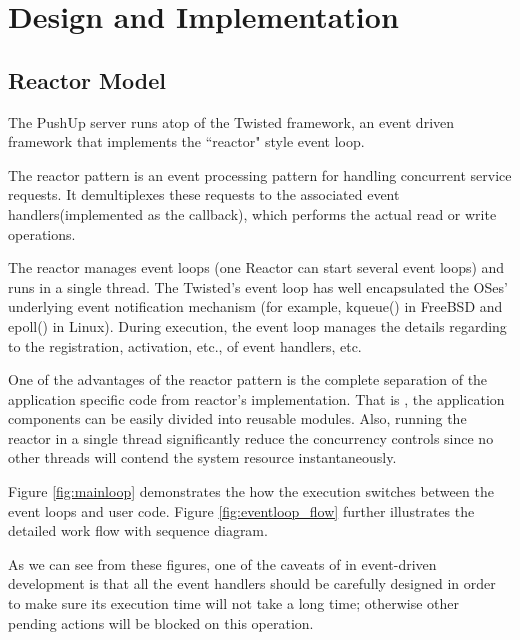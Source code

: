 \section {Design and Implementation\\}

\subsection{Reactor Model\\}
The PushUp server runs atop of the Twisted framework\cite{Twisted}, an 
event driven framework that implements the ``reactor" style event loop.

The reactor pattern is an event processing pattern for handling concurrent
service requests. It demultiplexes these requests to the associated event
handlers(implemented as the callback), which performs the actual read or 
write operations.

The reactor manages event loops (one Reactor 
can start several event loops) and runs in a single thread. The
Twisted's event loop has well encapsulated the OSes' underlying 
event notification mechanism (for example, kqueue() in FreeBSD 
and epoll() in Linux).
During execution, the event loop manages the details regarding to
the registration, activation, etc., of event handlers, etc.

One of the advantages of the reactor pattern is the complete separation
of the application specific code from reactor's implementation. That is
, the application components can be easily divided into reusable 
modules. Also, running the reactor in a single thread significantly
reduce the concurrency controls since no other threads will contend 
the system resource instantaneously.

Figure \ref{fig:mainloop} demonstrates the how the execution switches
between the event loops and user code. Figure \ref{fig:eventloop_flow} 
further illustrates the detailed work flow with sequence diagram.

As we can see from these figures, one of the caveats of in 
event-driven development is that all the event handlers should 
be carefully designed in order to make sure its execution time 
will not take a long time; otherwise other pending actions will
be blocked on this operation.

